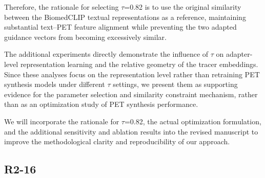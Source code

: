 {Therefore, the rationale for selecting \ensuremath{\tau}=0.82 is to use the original similarity between the BiomedCLIP textual representations as a reference, maintaining substantial text–PET feature alignment while preventing the two adapted guidance vectors from becoming excessively similar.

The additional experiments directly demonstrate the influence of \ensuremath{\tau} on adapter-level representation learning and the relative geometry of the tracer embeddings. Since these analyses focus on the representation level rather than retraining PET synthesis models under different \ensuremath{\tau} settings, we present them as supporting evidence for the parameter selection and similarity constraint mechanism, rather than as an optimization study of PET synthesis performance.

We will incorporate the rationale for \ensuremath{\tau}=0.82, the actual optimization formulation, and the additional sensitivity and ablation results into the revised manuscript to improve the methodological clarity and reproducibility of our approach.}



\subsection*{R2-16}

